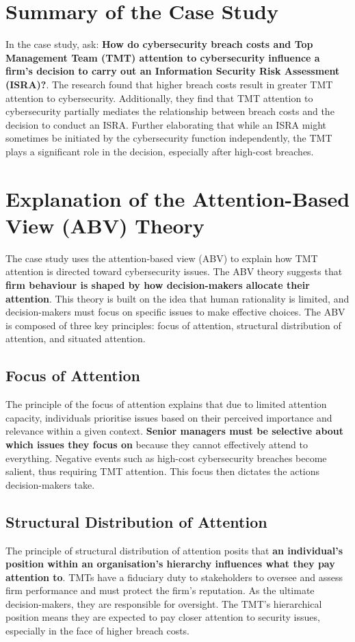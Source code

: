 \section{Summary of the Case Study}
In the case study, \citet{shaikh2023information} ask: \textbf{How do cybersecurity breach costs and Top Management Team (TMT) attention to cybersecurity influence a firm's decision to carry out an Information Security Risk Assessment (ISRA)?}. The research found that higher breach costs result in greater TMT attention to cybersecurity. Additionally, they find that TMT attention to cybersecurity partially mediates the relationship between breach costs and the decision to conduct an ISRA. Further elaborating that while an ISRA might sometimes be initiated by the cybersecurity function independently, the TMT plays a significant role in the decision, especially after high-cost breaches.

\section{Explanation of the Attention-Based View (ABV) Theory}
The case study uses the attention-based view (ABV) to explain how TMT attention is directed toward cybersecurity issues. The ABV theory suggests that \textbf{firm behaviour is shaped by how decision-makers allocate their attention}. This theory is built on the idea that human rationality is limited, and decision-makers must focus on specific issues to make effective choices. The ABV is composed of three key principles: focus of attention, structural distribution of attention, and situated attention.

    \subsection{Focus of Attention}
    The principle of the focus of attention explains that due to limited attention capacity, individuals prioritise issues based on their perceived importance and relevance within a given context. \textbf{Senior managers must be selective about which issues they focus on} because they cannot effectively attend to everything. Negative events such as high-cost cybersecurity breaches become salient, thus requiring TMT attention. This focus then dictates the actions decision-makers take.

    \subsection{Structural Distribution of Attention}
    The principle of structural distribution of attention posits that \textbf{an individual's position within an organisation's hierarchy influences what they pay attention to}. TMTs have a fiduciary duty to stakeholders to oversee and assess firm performance and must protect the firm's reputation. As the ultimate decision-makers, they are responsible for oversight. The TMT's hierarchical position means they are expected to pay closer attention to security issues, especially in the face of higher breach costs.

